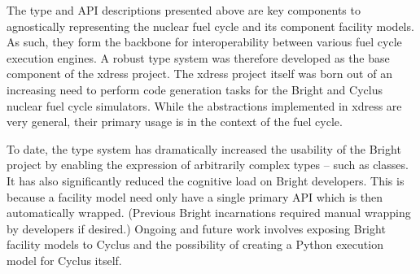 \documentclass{ansconfpaper}
\begin{document}
The type and API descriptions presented above are key components to agnostically
representing the nuclear fuel cycle and its component facility models.  As such,
they form the backbone for interoperability between various fuel cycle execution 
engines.  A robust type system was therefore developed as the base component of 
the xdress project.  The xdress project itself was born out of an increasing need 
to perform code generation tasks for the Bright and Cyclus nuclear fuel cycle 
simulators.  While the abstractions implemented in xdress are very general, their 
primary usage is in the context of the fuel cycle.  

To date, the type system has dramatically increased the usability of the Bright
project by enabling the expression of arbitrarily complex types -- such as classes.
It has also significantly reduced the cognitive load on Bright developers.  This 
is because a facility model need only have a single primary API which is then 
automatically wrapped. (Previous Bright incarnations required manual wrapping by
developers if desired.)  Ongoing and future work involves exposing Bright facility
models to Cyclus and the possibility of creating a Python 
execution model for Cyclus itself.

\setlength{\baselineskip}{12pt}



\end{document}
